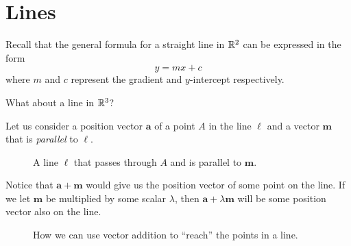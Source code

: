 \documentclass[12pt]{article}
\renewcommand{\vec}{\mathbf}
\begin{document}
\section{Lines}
\begin{disc}\label{disc:line}
	Recall that the general formula for a straight line in \(\mathbb{R}^2\) can be expressed in the form
	\[ y = mx + c \] 
	where \(m\) and \(c\) represent the gradient and \(y\)-intercept respectively.

	What about a line in \(\mathbb{R}^3\)?

	Let us consider a position vector \(\vec{a}\) of a point \(A\) in the line \(\ell\) and a vector \(\vec{m}\) that is \emph{parallel} to \(\ell\).

	\begin{figure}[H]
		\centering
		\caption{A line \(\ell\) that passes through \(A\) and is parallel to \(\vec{m}\).}
	\end{figure}

	Notice that \(\vec{a} + \vec{m}\) would give us the position vector of some point on the line. 
	If we let \(\vec{m}\) be multiplied by some scalar \(\lambda\), then \(\vec{a} + \lambda \vec{m}\) will be some position vector also on the line.

	\begin{figure}[H]
		\centering
		\caption{How we can use vector addition to ``reach'' the points in a line.}
	\end{figure}


\end{disc}
\end{document}
